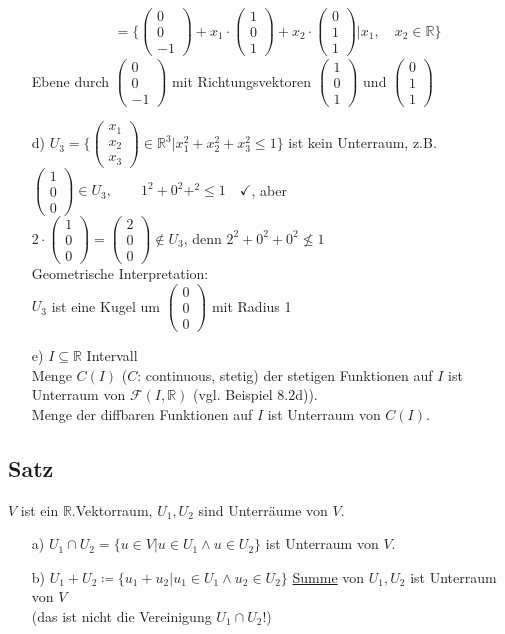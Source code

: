 \documentclass[12pt, titlepage]{article}
\newcommand{\R}{\mathds{R}}
\renewcommand{\vec}[1]{\left(\begin{array}{c}#1
	\end{array}\right)}
\renewcommand{\>}{\rightarrow}
\renewcommand{\*}{\cdot}
\begin{document}
\begin{itemize}
\begin{align*}
		&=\{\vec{0\\0\\-1}+x_1\*\vec{1\\0\\1}+x_2\*\vec{0\\1\\1}|x_1,\quad x_2\in\R\}
	\end{align*}
	Ebene durch $\vec{0\\0\\-1}$ mit Richtungsvektoren $\vec{1\\0\\1}$ und $\vec{0\\1\\1}$
	\item[d)] $U_3=\{\vec{x_1\\x_2\\x_3}\in\R^3|x_1^2+x_2^2+x_3^2\leq1\}$ ist kein Unterraum, z.B.\\
	$\vec{1\\0\\0}\in U_3,\qquad1^2+0^2+^2\leq1\quad\checkmark$, aber\\
	$2\*\vec{1\\0\\0}=\vec{2\\0\\0}\notin U_3$, denn $2^2+0^2+0^2\nleq1$\\
	Geometrische Interpretation:\\
	$U_3$ ist eine Kugel um $\vec{0\\0\\0}$ mit Radius 1
	\item[e)] $I\subseteq\R$ Intervall\\Menge $C(I)$ ($C$: continuous, stetig) der stetigen Funktionen auf $I$ ist Unterraum von $\mathcal{F}(I,\R)$ (vgl. Beispiel 8.2d)).\\
	Menge der diffbaren Funktionen auf $I$ ist Unterraum von $C(I)$.
	\end{itemize}
	\subsection{Satz}
	$V$ ist ein $\R$.Vektorraum, $U_1,U_2$ sind Unterräume von $V$.
	\begin{itemize}
		\item[a)] $U_1\cap U_2=\{u\in V|u\in U_1\wedge u\in U_2\}$ ist Unterraum von $V$.
		\item[b)] $U_1+U_2\coloneqq\{u_1+u_2|u_1\in U_1\wedge u_2\in U_2\}$ \underline{Summe} von $U_1,U_2$ ist Unterraum von $V$\\
	(das ist nicht die Vereinigung $U_1\cap U_2$!)
	\end{itemize}
\end{document}
